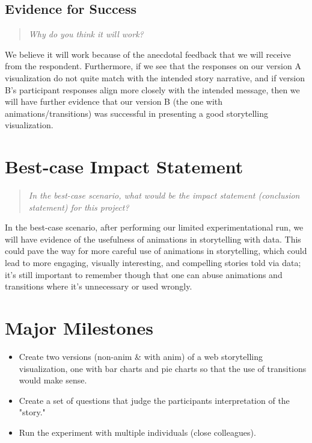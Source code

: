 \documentclass{proc}
\begin{document}
\subsection{Evidence for Success}
\begin{quote}
\textit{Why do you think it will work?} 
\end{quote}

We believe it will work because of the anecdotal feedback that we will receive from the respondent. Furthermore, if we see that the responses on our version A visualization do not quite match with the intended story narrative, and if version B's participant responses align more closely with the intended message, then we will have further evidence that our version B (the one with animations/transitions) was successful in presenting a good storytelling visualization.

\section{Best-case Impact Statement}
\begin{quote}
\textit{In the best-case scenario, what would be the impact statement (conclusion statement) for this project?}
\end{quote}

In the best-case scenario, after performing our limited experimentational run, we will have evidence of the usefulness of animations in storytelling with data. This could pave the way for more careful use of animations in storytelling, which could lead to more engaging, visually interesting, and compelling stories told via data; it's still important to remember though that one can abuse animations and transitions where it's unnecessary or used wrongly.

\section{Major Milestones}

\begin{itemize}
\item Create two versions (non-anim \& with anim) of a web storytelling visualization, one with bar charts and pie charts so that the use of transitions would make sense.
\item Create a set of questions that judge the participants interpretation of the "story."
\item Run the experiment with multiple individuals (close colleagues).
\end{itemize}
\end{document}
